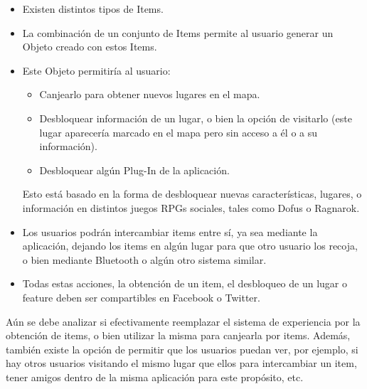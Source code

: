 \documentclass[10pt,letterpaper]{article}
\begin{document}
\begin{itemize}
 \item Existen distintos tipos de Items.
  \item La combinación de un conjunto de Items permite al usuario generar un Objeto creado con estos Items.
  \item Este Objeto permitiría al usuario:\\
  \begin{itemize}
  \item Canjearlo para obtener nuevos lugares en el mapa.
  \item Desbloquear información de un lugar, o bien la opción de visitarlo (este lugar aparecería marcado en el mapa pero sin acceso a él o a su información).
  \item Desbloquear algún Plug-In de la aplicación.
  \end{itemize}
  Esto está basado en la forma de desbloquear nuevas características, lugares, o información en distintos juegos RPGs sociales, tales como Dofus o Ragnarok.
  \item Los usuarios podrán intercambiar items entre sí, ya sea mediante la aplicación, dejando los items en algún lugar para que otro usuario los recoja, o bien mediante Bluetooth o algún otro sistema similar.
  \item Todas estas acciones, la obtención de un item, el desbloqueo de un lugar o feature deben ser compartibles en Facebook o Twitter.
\end{itemize}

Aún se debe analizar si efectivamente reemplazar el sistema de experiencia por la obtención de items, o bien utilizar la misma para canjearla por items. Además, también existe la opción de permitir que los usuarios puedan ver, por ejemplo, si hay otros usuarios visitando el mismo lugar que ellos para intercambiar un item, tener amigos dentro de la misma aplicación para este propósito, etc.
\end{document}
